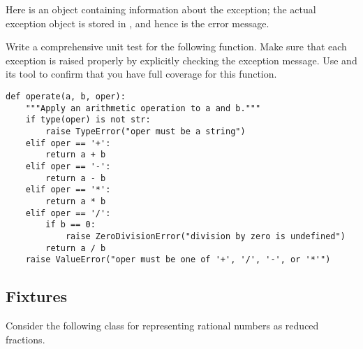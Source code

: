 Here  is an object containing information about the exception; the actual exception object is stored in , and hence  is the error message.

\begin{problem}
Write a comprehensive unit test for the following function.
Make sure that each exception is raised properly by explicitly checking the exception message.
Use  and its  tool to confirm that you have full coverage for this function.
\begin{lstlisting}
def operate(a, b, oper):
    """Apply an arithmetic operation to a and b."""
    if type(oper) is not str:
        raise TypeError("oper must be a string")
    elif oper == '+':
        return a + b
    elif oper == '-':
        return a - b
    elif oper == '*':
        return a * b
    elif oper == '/':
        if b == 0:
            raise ZeroDivisionError("division by zero is undefined")
        return a / b
    raise ValueError("oper must be one of '+', '/', '-', or '*'")
\end{lstlisting}
\end{problem}

\subsection*{Fixtures} %

Consider the following class for representing rational numbers as reduced fractions.

